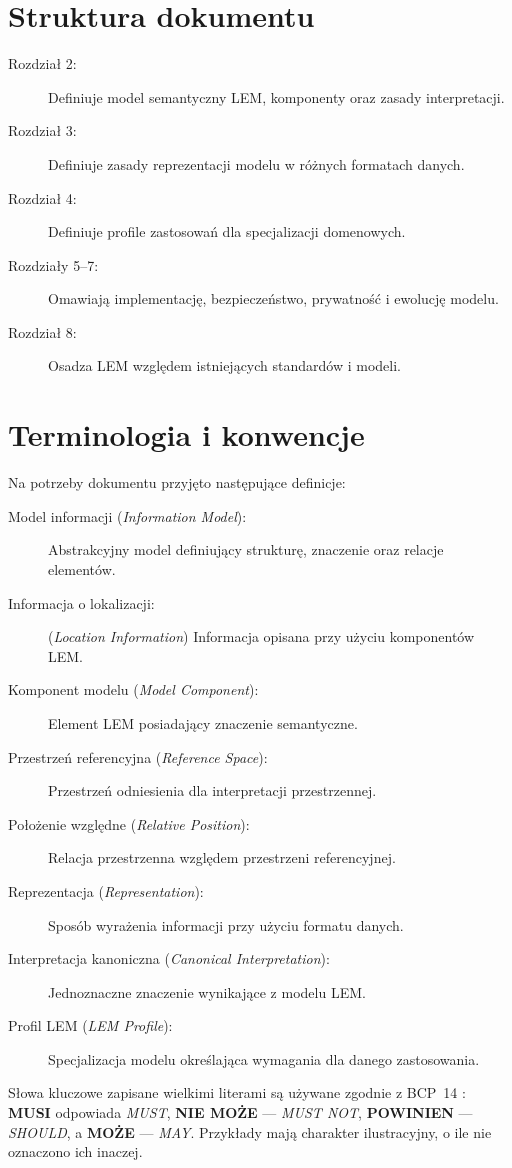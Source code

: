 \section{Struktura dokumentu}
\label{sec:struktura-dok}
\begin{description}
    \item[Rozdział 2:] Definiuje model semantyczny LEM, komponenty oraz zasady interpretacji.
    \item[Rozdział 3:] Definiuje zasady reprezentacji modelu w różnych formatach danych.
    \item[Rozdział 4:] Definiuje profile zastosowań dla specjalizacji domenowych.
    \item[Rozdziały 5--7:] Omawiają implementację, bezpieczeństwo, prywatność i ewolucję modelu.
    \item[Rozdział 8:] Osadza LEM względem istniejących standardów i modeli.
\end{description}

\section{Terminologia i konwencje}
\label{sec:terminologia}
Na potrzeby dokumentu przyjęto następujące definicje:

\begin{description}
    \item[Model informacji (\textit{Information Model}):] Abstrakcyjny model definiujący strukturę, znaczenie oraz relacje elementów.
    \item[Informacja o lokalizacji:] (\textit{Location Information}) Informacja opisana przy użyciu komponentów LEM.
    \item[Komponent modelu (\textit{Model Component}):] Element LEM posiadający znaczenie semantyczne.
    \item[Przestrzeń referencyjna (\textit{Reference Space}):] Przestrzeń odniesienia dla interpretacji przestrzennej.
    \item[Położenie względne (\textit{Relative Position}):] Relacja przestrzenna względem przestrzeni referencyjnej.
    \item[Reprezentacja (\textit{Representation}):] Sposób wyrażenia informacji przy użyciu formatu danych.
    \item[Interpretacja kanoniczna (\textit{Canonical Interpretation}):] Jednoznaczne znaczenie wynikające z modelu LEM.
    \item[Profil LEM (\textit{LEM Profile}):] Specjalizacja modelu określająca wymagania dla danego zastosowania.
\end{description}

Słowa kluczowe zapisane wielkimi literami są używane zgodnie z BCP~14 \cite{RFC2119,RFC8174}: \textbf{MUSI} odpowiada \textit{MUST}, \textbf{NIE MOŻE} --- \textit{MUST NOT}, \textbf{POWINIEN} --- \textit{SHOULD}, a \textbf{MOŻE} --- \textit{MAY}. Przykłady mają charakter ilustracyjny, o ile nie oznaczono ich inaczej.
